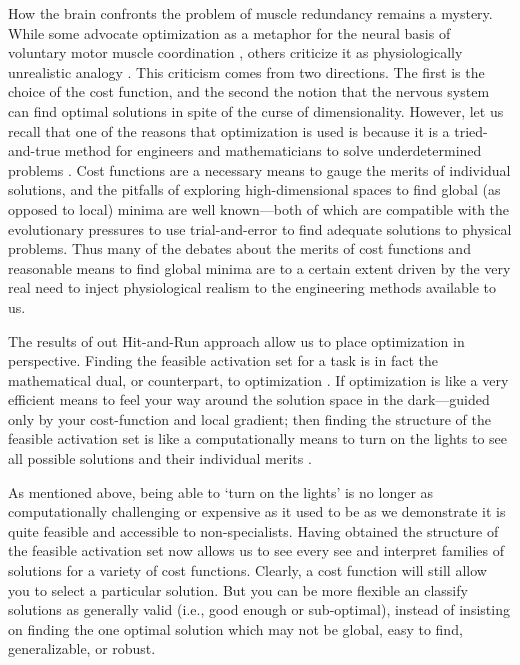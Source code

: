 \documentclass[10pt,letterpaper]{article}
\begin{document}
How the brain confronts the problem of muscle redundancy remains a mystery. While some advocate optimization as a metaphor for the neural basis of voluntary motor muscle coordination  \cite{scott2004optimal,todorov2002optimal}, others criticize  it as physiologically unrealistic analogy \cite{deRugy2012habitual,loeb2012optimal}. This criticism comes from two directions. The first is the choice of the cost function, and the second the notion that the nervous system can find optimal solutions in spite of the curse of dimensionality. However, let us recall that one of the reasons that optimization is used is because it is a tried-and-true method for engineers and mathematicians to solve underdetermined problems \cite{valero-cuevas2009computational}.  Cost functions are  a necessary means to gauge the merits of individual solutions, and the pitfalls of exploring high-dimensional spaces to find global (as opposed to local) minima are well known---both of which are compatible with the evolutionary pressures to use trial-and-error to find adequate solutions to physical problems. Thus many of the debates about the merits of cost functions \cite{Prilutsky2000Muscle,crowninshield1981physiologically} and reasonable means to find  global minima \cite{shadmehr2012biological} are to a certain extent driven by the very real need to inject physiological realism to the engineering methods available to us.

The results of out Hit-and-Run approach allow us to place optimization in perspective. Finding the feasible activation set for a task is in fact the mathematical dual, or counterpart, to optimization \cite{deBerg2008computational,Chvatal1983Linear}. If optimization is like a very efficient means to feel your way around the solution space in the dark---guided only by your cost-function and local gradient; then  finding the structure of the feasible activation set is like a computationally means to turn on the lights to see all possible solutions and their individual merits \cite{valero-cuevas2015fundamentals}.

As mentioned above, being able to  `turn on the lights' is no longer as computationally challenging or expensive as it used to be as we demonstrate it is quite feasible and accessible to non-specialists. Having obtained the structure of the feasible activation set now allows us to see every see and interpret  families of solutions for a variety of cost functions. Clearly, a cost function will still allow you to select a particular solution. But you can  be more flexible an classify solutions as generally valid (i.e., good enough or sub-optimal),  instead of insisting on finding the one optimal solution which may not be global, easy to find, generalizable, or robust.
\end{document}
